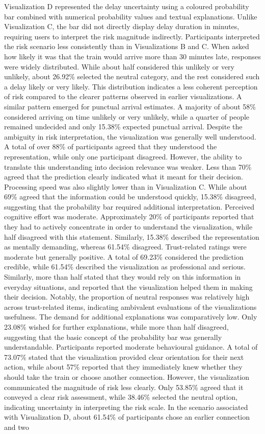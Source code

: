 \documentclass[final,journal,a4paper]{IEEEtran}
\begin{document}
Visualization D represented the delay uncertainty using a coloured probability bar combined with numerical probability values and textual explanations. Unlike Visualization C, the bar did not directly display delay duration in minutes, requiring users to interpret the risk magnitude indirectly. Participants interpreted the risk scenario less consistently than in Visualizations B and C. When asked how likely it was that the train would arrive more than 30 minutes late, responses were widely distributed. While about half considered this unlikely or very unlikely, about 26.92\% selected the neutral category, and the rest considered such a delay likely or very likely. This distribution indicates a less coherent perception of risk compared to the clearer patterns observed in earlier visualizations. A similar pattern emerged for punctual arrival estimates. A majority of about 58\% considered arriving on time unlikely or very unlikely, while a quarter of people remained undecided and only 15.38\% expected punctual arrival. Despite the ambiguity in risk interpretation, the visualization was generally well understood. A total of over 88\% of participants agreed that they understood the representation, while only one participant disagreed. However, the ability to translate this understanding into decision relevance was weaker. Less than 70\% agreed that the prediction clearly indicated what it meant for their decision. Processing speed was also slightly lower than in Visualization C. While about 69\% agreed that the information could be understood quickly, 15.38\% disagreed, suggesting that the probability bar required additional interpretation. Perceived cognitive effort was moderate. Approximately 20\% of participants reported that they had to actively concentrate in order to understand the visualization, while half disagreed with this statement. Similarly, 15.38\% described the representation as mentally demanding, whereas 61.54\% disagreed. Trust-related ratings were moderate but generally positive. A total of 69.23\% considered the prediction credible, while 61.54\% described the visualization as professional and serious. Similarly, more than half stated that they would rely on this information in everyday situations, and reported that the visualization helped them in making their decision. Notably, the proportion of neutral responses was relatively high across trust-related items, indicating ambivalent evaluations of the visualizations usefulness. The demand for additional explanations was comparatively low. Only 23.08\% wished for further explanations, while more than half disagreed, suggesting that the basic concept of the probability bar was generally understandable. Participants reported moderate behavioural guidance. A total of 73.07\% stated that the visualization provided clear orientation for their next action, while about 57\% reported that they immediately knew whether they should take the train or choose another connection. However, the visualization communicated the magnitude of risk less clearly. Only 53.85\% agreed that it conveyed a clear risk assessment, while 38.46\% selected the neutral option, indicating uncertainty in interpreting the risk scale. In the scenario associated with Visualization D, about 61.54\% of participants chose an earlier connection and two 
\end{document}
